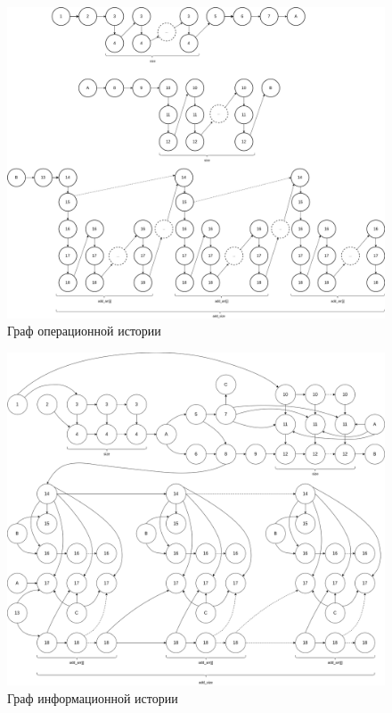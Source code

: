 \begin{figure}[H]
	\begin{center}
		\includegraphics[scale=0.28]{img/operational_history.png}
	\end{center}
	\captionsetup{justification=centering}
	\caption{Граф операционной истории}
	\label{img:operational_history}
\end{figure}

\begin{figure}[H]
	\begin{center}
		\includegraphics[scale=0.3]{img/information_history.png}
	\end{center}
	\captionsetup{justification=centering}
	\caption{Граф информационной истории}
	\label{img:information_history}
\end{figure}